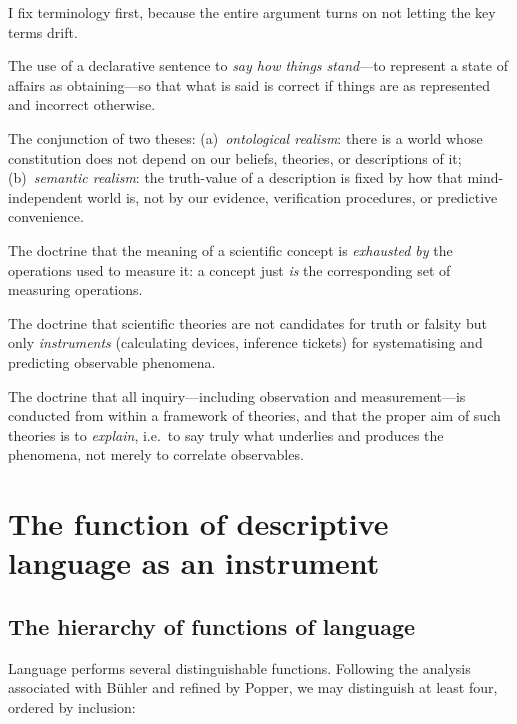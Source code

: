 \documentclass[12pt]{article}
\begin{document}
I fix terminology first, because the entire argument turns on not letting
the key terms drift.

\begin{description}[leftmargin=1.6em,style=nextline]
\item[Descriptive (representative) use of language.] The use of a
declarative sentence to \emph{say how things stand}---to represent a
state of affairs as obtaining---so that what is said is correct if things
are as represented and incorrect otherwise.
\item[Realism.] The conjunction of two theses: (a)~\emph{ontological
realism}: there is a world whose constitution does not depend on our
beliefs, theories, or descriptions of it; (b)~\emph{semantic realism}:
the truth-value of a description is fixed by how that mind-independent
world is, not by our evidence, verification procedures, or predictive
convenience.
\item[Operationalism.] The doctrine that the meaning of a scientific
concept is \emph{exhausted by} the operations used to measure it: a
concept just \emph{is} the corresponding set of measuring operations.
\item[Instrumentalism.] The doctrine that scientific theories are not
candidates for truth or falsity but only \emph{instruments} (calculating
devices, inference tickets) for systematising and predicting observable
phenomena.
\item[Theoreticism.] The doctrine that all inquiry---including
observation and measurement---is conducted from within a framework of
theories, and that the proper aim of such theories is to \emph{explain},
i.e.\ to say truly what underlies and produces the phenomena, not merely
to correlate observables.
\end{description}

\section{The function of descriptive language as an instrument}

\subsection{The hierarchy of functions of language}

Language performs several distinguishable functions. Following the
analysis associated with B\"uhler and refined by Popper, we may
distinguish at least four, ordered by inclusion:
\end{document}
